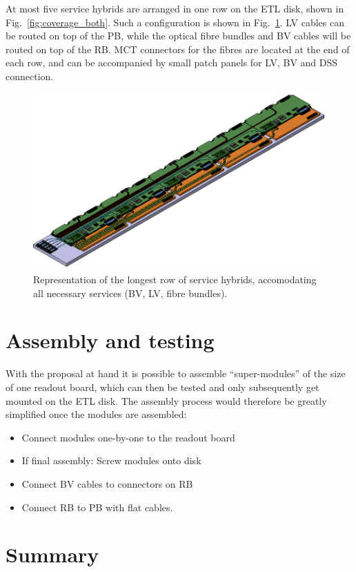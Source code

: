 \documentclass[11pt]{article}
\begin{document}
At most five service hybrids are arranged in one row on the ETL disk, shown in Fig.~\ref{fig:coverage_both}.
Such a configuration is shown in Fig.~\ref{fig:services}.
LV cables can be routed on top of the PB, while the optical fibre bundles and BV cables will be routed on top of the RB.
MCT connectors for the fibres are located at the end of each row, and can be accompanied by small patch panels for LV, BV and DSS connection.

\begin{figure}[!h]
\centering
\includegraphics[width=0.90 \textwidth]{figures/services.png}
\caption{
Representation of the longest row of service hybrids, accomodating all necessary services (BV, LV, fibre bundles).
}
\label{fig:services}
\end{figure}

\section{Assembly and testing}

With the proposal at hand it is possible to assemble ``super-modules'' of the size of one readout board, which can then be tested and only subsequently get mounted on the ETL disk.
The assembly process would therefore be greatly simplified once the modules are assembled:
\begin{itemize}
  \item Connect modules one-by-one to the readout board
  \item If final assembly: Screw modules onto disk
  \item Connect BV cables to connectors on RB
  \item Connect RB to PB with flat cables.
\end{itemize}


\section{Summary}
\end{document}
